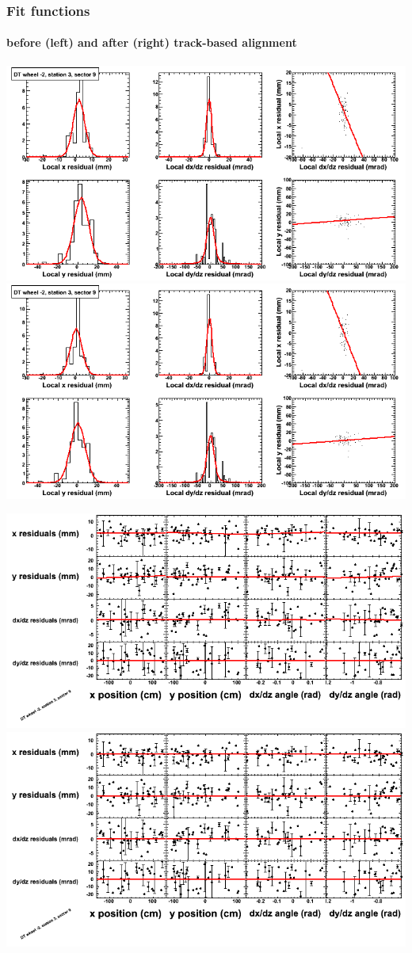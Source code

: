 \documentclass[compress]{beamer}
\begin{document}
\begin{frame}
\frametitle{Fit functions}
\framesubtitle{before (left) and after (right) track-based alignment}
\includegraphics[width=0.5\linewidth]{fitfunctions_re01/MBwhAst3sec09_bellcurves.png} \includegraphics[width=0.5\linewidth]{fitfunctions_re05/MBwhAst3sec09_bellcurves.png}

\includegraphics[width=0.5\linewidth]{fitfunctions_re01/MBwhAst3sec09_polynomials.png} \includegraphics[width=0.5\linewidth]{fitfunctions_re05/MBwhAst3sec09_polynomials.png}
\end{frame}
\end{document}
